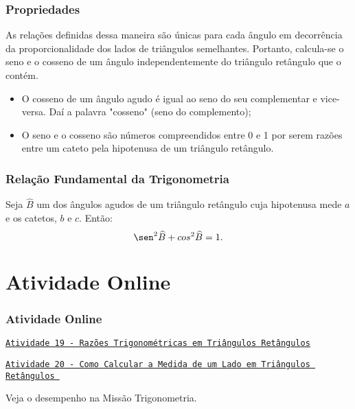 \documentclass[10pt]{beamer}
\begin{document}

\begin{frame}
\frametitle{Propriedades} %
As relações definidas dessa maneira são únicas para cada ângulo em
decorrência da proporcionalidade dos lados de triângulos
semelhantes. Portanto, calcula-se o seno e o cosseno de um ângulo
independentemente do triângulo retângulo que o contém.

\begin{proposicao}
\begin{itemize}
	\item O cosseno de um ângulo agudo é igual ao seno do seu
	complementar e vice-versa. Daí a palavra "cosseno" (seno do
	complemento);
	\item O seno e o cosseno são números compreendidos entre 0 e 1 por
	serem razões entre um cateto pela hipotenusa de um triângulo
	retângulo.
\end{itemize}
\end{proposicao}




\end{frame}


\begin{frame}
\frametitle{Relação Fundamental da Trigonometria} %

\begin{proposicao}
Seja $\widehat B$ um dos ângulos agudos de um triângulo retângulo
cuja hipotenusa mede $a$ e os catetos, $b$ e $c$. Então:
$$\sen^2 \widehat B + \cos^2 \widehat B = 1.$$
\end{proposicao}
\end{frame}

\section{Atividade Online}
\begin{frame}
\frametitle{Atividade Online} %

\href{https://pt.khanacademy.org/math/trigonometry/trigonometry-right-triangles/intro-to-the-trig-ratios/e/trigonometry_1}
{{\tt Atividade 19 - Razões Trigonométricas em Triângulos
Retângulos}}

\href{https://pt.khanacademy.org/math/trigonometry/trigonometry-right-triangles/trig-solve-for-a-side/e/trigonometry_2}
{{\tt Atividade 20 - Como Calcular a Medida de um Lado em Triângulos
Retângulos }}


Veja o desempenho na Missão Trigonometria.


\end{frame}
\end{document}
